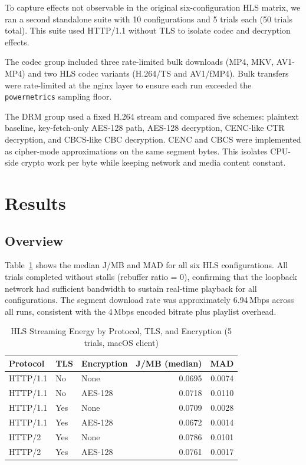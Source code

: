 \documentclass[conference]{IEEEtran}
\begin{document}
To capture effects not observable in the original six-configuration HLS matrix, we ran a
second standalone suite with 10 configurations and 5 trials each (50 trials total). This
suite used HTTP/1.1 without TLS to isolate codec and decryption effects.

The codec group included three rate-limited bulk downloads (MP4, MKV, AV1-MP4) and two
HLS codec variants (H.264/TS and AV1/fMP4). Bulk transfers were rate-limited at the nginx
layer to ensure each run exceeded the \texttt{powermetrics} sampling floor.

The DRM group used a fixed H.264 stream and compared five schemes: plaintext baseline,
key-fetch-only AES-128 path, AES-128 decryption, CENC-like CTR decryption, and CBCS-like
CBC decryption. CENC and CBCS were implemented as cipher-mode approximations on the same
segment bytes. This isolates CPU-side crypto work per byte while keeping network and media
content constant.


\section{Results}

\subsection{Overview}

Table~\ref{tab:hls} shows the median J/MB and MAD for all six HLS configurations.
All trials completed without stalls (rebuffer ratio = 0), confirming that the loopback
network had sufficient bandwidth to sustain real-time playback for all configurations.
The segment download rate was approximately 6.94\,Mbps across all runs, consistent
with the 4\,Mbps encoded bitrate plus playlist overhead.

\begin{table}[t]
\caption{HLS Streaming Energy by Protocol, TLS, and Encryption (5 trials, macOS client)}
\label{tab:hls}
\centering
\begin{tabular}{lllrr}
\hline
Protocol & TLS & Encryption & J/MB (median) & MAD \\
\hline
HTTP/1.1 & No  & None    & 0.0695 & 0.0074 \\
HTTP/1.1 & No  & AES-128 & 0.0718 & 0.0110 \\
HTTP/1.1 & Yes & None    & 0.0709 & 0.0028 \\
HTTP/1.1 & Yes & AES-128 & 0.0672 & 0.0014 \\
HTTP/2   & Yes & None    & 0.0786 & 0.0101 \\
HTTP/2   & Yes & AES-128 & 0.0761 & 0.0017 \\
\hline
\end{tabular}
\end{table}
\end{document}
